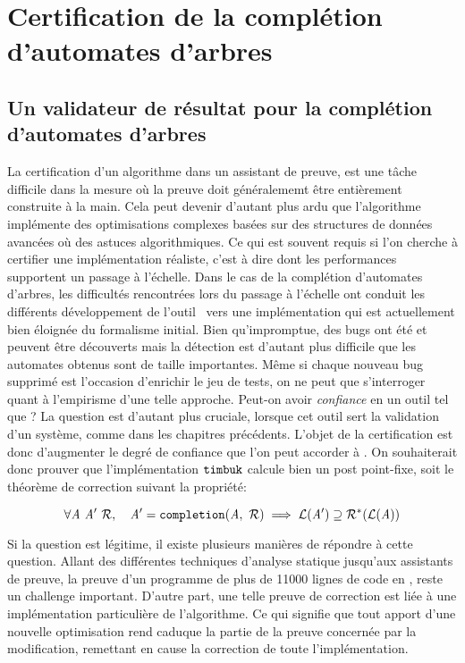 
\chapter{Certification de la complétion d'automates d'arbres}
\label{chap:certif}


\switchlstcoq 

\section{Un validateur de résultat pour la complétion d'automates d'arbres}
\label{sec:objectives}


La certification d'un algorithme dans un assistant de preuve, est une tâche difficile dans la mesure
où la preuve doit généralememt être entièrement construite à la main. Cela peut devenir d'autant plus ardu que l'algorithme implémente
des optimisations complexes basées sur des structures de données
avancées où des astuces algorithmiques. Ce qui est souvent requis si l'on cherche à certifier une implémentation réaliste,
c'est à dire dont les performances supportent un passage à l'échelle. 
Dans le cas de la complétion d'automates d'arbres, les difficultés rencontrées lors du passage à l'échelle ont
conduit les différents développement de l'outil \timbuk\ vers une implémentation qui est actuellement bien éloignée du formalisme initial.
Bien qu'impromptue, des bugs ont été et peuvent être découverts mais la détection est d'autant plus difficile que les automates
obtenus sont de taille importantes. Même si chaque nouveau bug supprimé est l'occasion d'enrichir le jeu de tests, on ne peut que
s'interroger quant à l'empirisme d'une telle approche.
Peut-on avoir {\em confiance} en un outil tel que \timbuk? La question est d'autant plus cruciale, lorsque cet outil sert
la validation d'un système, comme dans les chapitres précédents.
L'objet de la certification est donc d'augmenter le degré de confiance que l'on peut accorder à \timbuk.
On souhaiterait donc prouver que l'implémentation $\mathtt{timbuk}$ calcule bien un post point-fixe, soit 
le théorème de correction suivant la propriété:

\[\forall \mathit A\ \mathit A'\ \mathcal R,\quad \mathit A' = \mathtt{completion}(\mathit A,\ \mathcal R) \; \Longrightarrow \; \mathcal{L}(\mathit A') \supseteq \mathcal R^*(\mathcal{L}(\mathit A))\]

Si la question est légitime, il existe plusieurs manières de répondre à cette question. Allant des différentes
techniques d'analyse statique jusqu'aux assistants de preuve, la preuve d'un programme de plus de 11000 lignes
de code en \ocaml, reste un challenge important. D'autre part, une telle preuve de correction est liée 
à une implémentation particulière de l'algorithme. Ce qui signifie que tout apport d'une nouvelle optimisation
rend caduque la partie de la preuve concernée par la modification, remettant en cause la correction de toute
l'implémentation.

